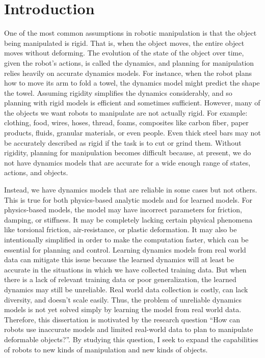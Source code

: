 \section{Introduction} \label{Intro:sec:Intro}

One of the most common assumptions in robotic manipulation is that the object being manipulated is rigid. That is, when the object moves, the entire object moves without deforming. The evolution of the state of the object over time, given the robot's actions, is called the dynamics, and planning for manipulation relies heavily on accurate dynamics models. For instance, when the robot plans how to move its arm to fold a towel, the dynamics model might predict the shape the towel. Assuming rigidity simplifies the dynamics considerably, and so planning with rigid models is efficient and sometimes sufficient. However, many of the objects we want robots to manipulate are not actually rigid. For example: clothing, food, wires, hoses, thread, foams, composites like carbon fiber, paper products, fluids, granular materials, or even people. Even thick steel bars may not be accurately described as rigid if the task is to cut or grind them. Without rigidity, planning for manipulation becomes difficult because, at present, we do not have dynamics models that are accurate for a wide enough range of states, actions, and objects.

Instead, we have dynamics models that are reliable in some cases but not others. This is true for both physics-based analytic models and for learned models. For physics-based models, the model may have incorrect parameters for friction, damping, or stiffness. It may be completely lacking certain physical phenomena like torsional friction, air-resistance, or plastic deformation. It may also be intentionally simplified in order to make the computation faster, which can be essential for planning and control. Learning dynamics models from real world data can mitigate this issue  because the learned dynamics will at least be accurate in the situations in which we have collected training data. But when there is a lack of relevant training data or poor generalization, the learned dynamics may still be unreliable. Real world data collection is costly, can lack diversity, and doesn't scale easily. Thus, the problem of unreliable dynamics models is not yet solved simply by learning the model from real world data. Therefore, this dissertation is motivated by the research question ``How can robots use inaccurate models and limited real-world data to plan to manipulate deformable objects?''. By studying this question, I seek to expand the capabilities of robots to new kinds of manipulation and new kinds of objects.

